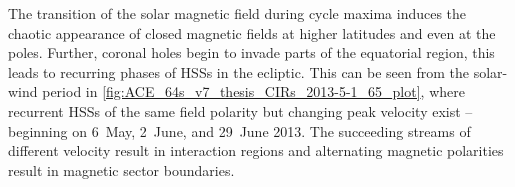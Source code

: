 The transition of the solar magnetic field during cycle maxima induces the chaotic appearance of closed magnetic fields at higher latitudes and even at the poles. Further, coronal holes begin to invade parts of the equatorial region, this leads to recurring phases of HSSs in the ecliptic. This can be seen from the solar-wind period in \autoref{fig:ACE_64s_v7_thesis_CIRs_2013-5-1_65_plot}, where recurrent HSSs of the same field polarity but changing peak velocity exist -- beginning on 6~May, 2~June, and 29~June 2013. The succeeding streams of different velocity result in interaction regions and alternating magnetic polarities result in magnetic sector boundaries.


